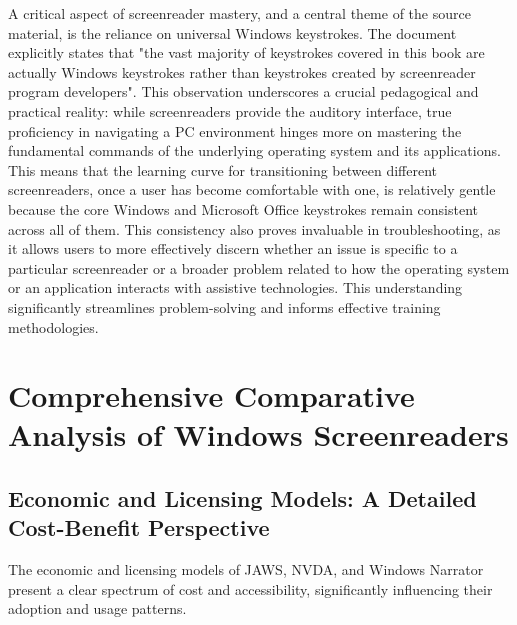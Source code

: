A critical aspect of screenreader mastery, and a central theme of the source material, is the reliance on universal Windows keystrokes. The document explicitly states that "the vast majority of keystrokes covered in this book are actually Windows keystrokes rather than keystrokes created by screenreader program developers".\supercite{kingsbury2025} This observation underscores a crucial pedagogical and practical reality: while screenreaders provide the auditory interface, true proficiency in navigating a PC environment hinges more on mastering the fundamental commands of the underlying operating system and its applications. This means that the learning curve for transitioning between different screenreaders, once a user has become comfortable with one, is relatively gentle because the core Windows and Microsoft Office keystrokes remain consistent across all of them.\supercite{kingsbury2025} This consistency also proves invaluable in troubleshooting, as it allows users to more effectively discern whether an issue is specific to a particular screenreader or a broader problem related to how the operating system or an application interacts with assistive technologies. This understanding significantly streamlines problem-solving and informs effective training methodologies.

\section{Comprehensive Comparative Analysis of Windows Screenreaders}

\subsection{Economic and Licensing Models: A Detailed Cost-Benefit Perspective}
The economic and licensing models of JAWS, NVDA, and Windows Narrator present a clear spectrum of cost and accessibility, significantly influencing their adoption and usage patterns.
